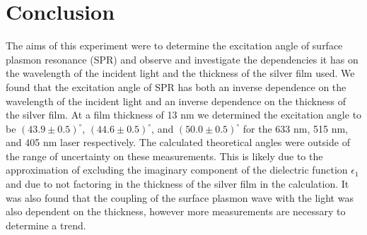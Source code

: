 \documentclass[%
reprint,
amsmath,amssymb,
aps,
]{revtex4-2}
\begin{document}
	\section{Conclusion}
		
		The aims of this experiment were to determine the excitation angle of surface plasmon resonance (SPR) and observe and investigate the dependencies it has on the wavelength of the incident light and the thickness of the silver film used. We found that the excitation angle of SPR has both an inverse dependence on the wavelength of the incident light and an inverse dependence on the thickness of the silver film.  At a film thickness of 13 nm we determined the excitation angle to be $(43.9\pm0.5)^\circ$, $(44.6\pm0.5)^\circ$, and $(50.0\pm0.5)^\circ$ for the 633 nm, 515 nm, and 405 nm laser respectively. The calculated theoretical angles were outside of the range of uncertainty on these measurements. This is likely due to the approximation of excluding the imaginary component of the dielectric function $\epsilon_1$ and due to not factoring in the thickness of the silver film in the calculation. It was also found that the coupling of the surface plasmon wave with the light was also dependent on the thickness, however more measurements are necessary to determine a trend.
		
		
	\clearpage

		
\end{document}
